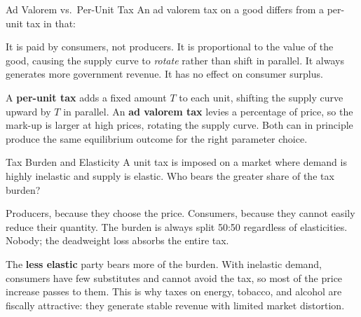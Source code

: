 \documentclass[paper=a5]{scrartcl}
\begin{document}
\begin{question}[type=mc]{Ad Valorem vs.\ Per-Unit Tax}
An ad valorem tax on a good differs from a per-unit tax in that:
\begin{choices}
  \choice        It is paid by consumers, not producers.
  \correctchoice It is proportional to the value of the good, causing the supply
                 curve to \emph{rotate} rather than shift in parallel.
  \choice        It always generates more government revenue.
  \choice        It has no effect on consumer surplus.
\end{choices}
\begin{solution}
  A \textbf{per-unit tax} adds a fixed amount $T$ to each unit, shifting the
  supply curve upward by $T$ in parallel. An \textbf{ad valorem tax} levies a
  percentage of price, so the mark-up is larger at high prices, rotating the
  supply curve. Both can in principle produce the same equilibrium outcome
  for the right parameter choice.
\end{solution}
\end{question}

\begin{question}[type=mc]{Tax Burden and Elasticity}
A unit tax is imposed on a market where demand is highly inelastic and supply
is elastic. Who bears the greater share of the tax burden?
\begin{choices}
  \choice        Producers, because they choose the price.
  \correctchoice Consumers, because they cannot easily reduce their quantity.
  \choice        The burden is always split 50:50 regardless of elasticities.
  \choice        Nobody; the deadweight loss absorbs the entire tax.
\end{choices}
\begin{solution}
  The \textbf{less elastic} party bears more of the burden. With inelastic
  demand, consumers have few substitutes and cannot avoid the tax, so most of
  the price increase passes to them. This is why taxes on energy, tobacco, and
  alcohol are fiscally attractive: they generate stable revenue with limited
  market distortion.
\end{solution}
\end{question}
\end{document}
